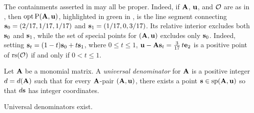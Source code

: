 \documentclass{amsart}
\begin{document}
\begin{example}
   \label{ex: ft.1}
   The containments asserted in  may all be proper.
   Indeed, if $\mathbf{A}$, $\mathbf{u}$, and $\mathcal{O}$ are as in , then $\operatorname{opt} \mathrm{P}(\mathbf{A},\mathbf{u})$, highlighted in green in , is the line segment connecting $\mathbf{s}_0 = (2/17, 1/17, 1/17)$ and $\mathbf{s}_1 = (1/17, 0, 3/17)$.
   Its relative interior excludes both $\mathbf{s}_0$ and $\mathbf{s}_1$, while the set of special points for $(\mathbf{A},\mathbf{u})$ excludes only $\mathbf{s}_0$.
   Indeed, setting $\mathbf{s}_t=(1-t)\mathbf{s}_0 + t \mathbf{s}_1$, where $0\le t\le 1$, $\mathbf{u} - \mathbf{A}\mathbf{s}_t = \frac{3}{17}\,t \mathbf{e}_2$ is a positive point of $\operatorname{rs}(\mathcal{O})$ if and only if $0<t\le 1$.
\end{example}


\begin{definition}
   \label{universal denominator: D}
   Let $\mathbf{A}$ be a monomial matrix.
   A \emph{universal denominator} for $\mathbf{A}$ is a positive integer $d = d(\mathbf{A})$ such that for every $\mathbf{A}$-pair $(\mathbf{A}, \mathbf{u})$, there exists a point $\mathbf{s} \in \operatorname{sp}(\mathbf{A}, \mathbf{u})$ so that $d \mathbf{s}$ has integer coordinates.
\end{definition}

\begin{theorem}
   \label{universal-denominators-exist:  T}
   Universal denominators exist.
\end{theorem}
\end{document}

